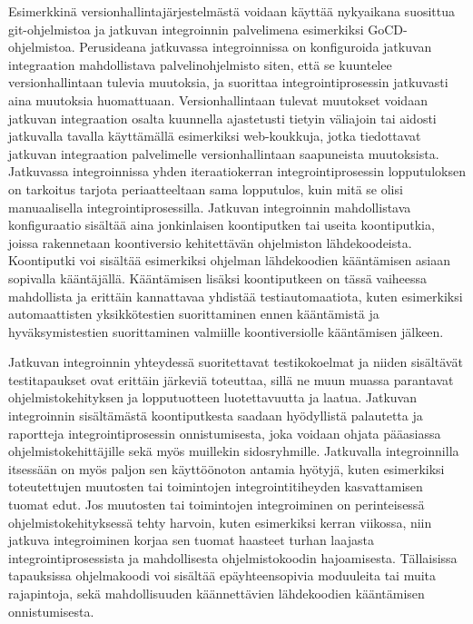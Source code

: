   Esimerkkinä ver\-si\-on\-hal\-lin\-ta\-jär\-jes\-tel\-mä\-stä  voidaan käyttää nykyaikana suosittua git-oh\-jel\-mis\-to\-a  ja jatkuvan integroinnin palvelimena esimerkiksi GoCD-oh\-jel\-mis\-to\-a.
  Perusideana jatkuvassa integroinnissa on konfiguroida jatkuvan integraation mahdollistava palvelinohjelmisto siten, että se kuuntelee versionhallintaan tulevia muutoksia, ja suorittaa integrointiprosessin jatkuvasti aina muutoksia huomattuaan.
  Versionhallintaan tulevat muutokset voidaan jatkuvan integraation osalta kuunnella ajastetusti tietyin väliajoin tai aidosti jatkuvalla tavalla käyttämällä esimerkiksi web-koukkuja, jotka tiedottavat jatkuvan integraation palvelimelle versionhallintaan saapuneista muutoksista.
  Jatkuvassa integroinnissa yhden iteraatiokerran integrointiprosessin lopputuloksen on tarkoitus tarjota periaatteeltaan sama lopputulos, kuin mitä se olisi manuaalisella integrointiprosessilla.
  Jatkuvan integroinnin mahdollistava konfiguraatio sisältää aina jonkinlaisen koontiputken tai useita koontiputkia, joissa rakennetaan koontiversio kehitettävän ohjelmiston lähdekoodeista.
  Koontiputki voi sisältää esimerkiksi ohjelman lähdekoodien kääntämisen asiaan sopivalla kääntäjällä.
  Kääntämisen lisäksi koontiputkeen on tässä vaiheessa mahdollista ja erittäin kannattavaa yhdistää testiautomaatiota, kuten esimerkiksi automaattisten yksikkötestien suorittaminen ennen kääntämistä ja hyväksymistestien suorittaminen valmiille koontiversiolle kääntämisen jälkeen.

  Jatkuvan integroinnin yhteydessä suoritettavat testikokoelmat ja niiden sisältävät testitapaukset ovat erittäin järkeviä toteuttaa, sillä ne muun muassa parantavat ohjelmistokehityksen ja lopputuotteen luotettavuutta ja laatua.
  Jatkuvan integroinnin sisältämästä koontiputkesta saadaan hyödyllistä palautetta ja raportteja integrointiprosessin onnistumisesta, joka voidaan ohjata pääasiassa ohjelmistokehittäjille sekä myös muillekin sidosryhmille.
  Jatkuvalla integroinnilla itsessään on myös paljon sen käyttöönoton antamia hyötyjä, kuten esimerkiksi toteutettujen muutosten tai toimintojen integrointitiheyden kasvattamisen tuomat edut.
  Jos muutosten tai toimintojen integroiminen on perinteisessä ohjelmistokehityksessä tehty harvoin, kuten esimerkiksi kerran viikossa, niin jatkuva integroiminen korjaa sen tuomat haasteet turhan laajasta integrointiprosessista ja mahdollisesta ohjelmistokoodin hajoamisesta.
  Tällaisissa tapauksissa ohjelmakoodi voi sisältää epäyhteensopivia moduuleita tai muita rajapintoja, sekä mahdollisuuden käännettävien lähdekoodien kääntämisen onnistumisesta.

